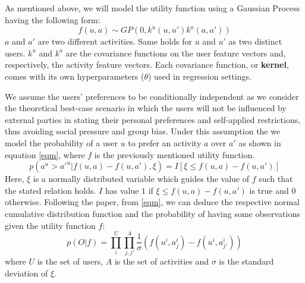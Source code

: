 \documentclass[11pt,a4paper,oneside]{article}
\begin{document}
As mentioned above, we will model the utility function using a Gaussian Process having the following form:
\begin{equation}
    \label{gp}
    f(u, a) \sim GP(0, k^u(u,u')k^a(a, a'))
\end{equation}
$a$ and $a'$ are two different activities. Same holds for $u$ and $u'$ as two distinct users. $k^u$ and $k^a$ are the covariance functions on the user feature vectors and, respectively, the activity feature vectors. Each covariance function, or \textbf{kernel}, comes with its own hyperparameters ($\theta$) used in regression settings.

We assume the users' preferences to be conditionally independent as we consider the theoretical best-case scenario in which the users will not be influenced by external parties in stating their personal preferences and self-applied restrictions, thus avoiding social pressure and group bias. Under this assumption the we model the probability of a user $u$ to prefer an activity $a$ over $a'$ as shown in equation \ref{eqm}, where $f$ is the previously mentioned utility function.
\begin{equation}
    \label{eqm}
    p(a^u > a'^u | f(u,a) - f(u,a'), \xi) = I[\xi \leq f(u,a) - f(u,a')]
\end{equation}
Here, $\xi$ is a normally distributed variable which guides the value of $f$ such that the stated relation holds. $I$ has value $1$ if $\xi \leq f(u,a) - f(u,a')$ is true and $0$ otherwise. Following the paper, from \ref{eqm}, we can deduce the respective normal cumulative distribution function and the probability of having some observations given the utility function $f$:
\begin{equation}
    \label{eqm}
    p(O|f) = \prod_i^U \prod_{j, j'}^A \frac{1}{\sigma} (f(u^i, a^i_j) - f(u^i, a^i_{j'})) 
\end{equation}
where $U$ is the set of users, $A$ is the set of activities and $\sigma$ is the standard deviation of $\xi$. 
\end{document}
